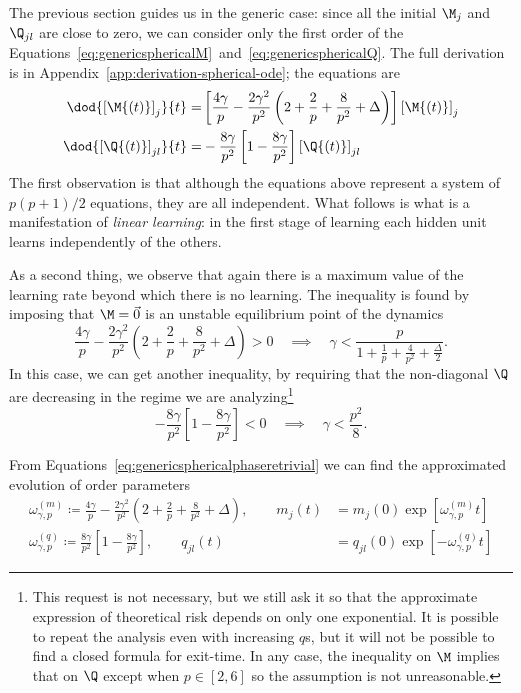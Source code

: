 The previous section guides us in the generic case: since all the initial \(\M_j\) and \(\Q_{jl}\) are close to zero,
we can consider only the first order of the Equations~\eqref{eq:genericsphericalM}~and~\eqref{eq:genericsphericalQ}.
The full derivation is in Appendix~\ref{app:derivation-spherical-ode}; the equations are
\begin{subequations}\label{eq:genericsphericalphaseretrivial}\begin{align}
  \dod{\left[\M{\left(t\right)}\right]_{j}}{t} =&
    \left[
      \frac{4 \gamma}{p} -\frac{2 \gamma^2}{p^2} \left(2 +\frac{2}{p} + \frac{8}{p^2} + \Delta \right)
    \right] \left[\M{\left(t\right)}\right]_{j} \\
  \dod{\left[\Q{\left(t\right)}\right]_{jl}}{t} =&
   -\frac{8 \gamma}{p^2} \left[1-\frac{8\gamma}{p^2}\right] \left[\Q{\left(t\right)}\right]_{jl}
\end{align}\end{subequations}
The first observation is that although the equations above represent a system of \(p(p+1)/2\) equations,
they are all independent. What follows is what is a manifestation of \emph{linear learning}: 
in the first stage of learning each hidden unit learns independently of the others.

As a second thing, we observe that again there is a maximum value of the learning rate beyond which there is no learning.
The inequality is found by imposing that \(\M=\vec{0}\) is an unstable equilibrium point of the dynamics
\[
  \frac{4 \gamma}{p} -\frac{2 \gamma^2}{p^2} \left(2 +\frac{2}{p} + \frac{8}{p^2} + \Delta \right) > 0 \quad \implies\quad
  \gamma < \frac{p}{1 +\frac{1}{p} + \frac{4}{p^2} + \frac\Delta2}.
\]
In this case, we can get another inequality, by requiring that the non-diagonal \(\Q\) are decreasing in the regime we are analyzing\footnote{
  This request is not necessary, but we still ask it so that the approximate expression of theoretical risk depends on only one exponential.
  It is possible to repeat the analysis even with increasing \(q\)s, but it will not be possible to find a closed formula for exit-time.
  In any case, the inequality on \(\M\) implies that on \(\Q\) except when \(p\in[2,6]\) so the assumption is not unreasonable.
}
\[
  -\frac{8 \gamma}{p^2} \left[1-\frac{8\gamma}{p^2}\right] < 0 \quad \implies\quad
  \gamma < \frac{p^2}{8}.
\]

From Equations~\eqref{eq:genericsphericalphaseretrivial} we can find the approximated evolution of order parameters
\[\begin{split}
  \omega^{(m)}_{\gamma,p} \coloneqq \frac{4 \gamma}{p} -\frac{2 \gamma^2}{p^2} \left(2 +\frac{2}{p} + \frac{8}{p^2} + \Delta \right), \qquad
  m_j{(t)} &= m_j{(0)} \exp\left[\omega^{(m)}_{\gamma,p}t\right] \\
  \omega^{(q)}_{\gamma,p} \coloneqq \frac{8 \gamma}{p^2} \left[1-\frac{8\gamma}{p^2}\right], \qquad
  q_{jl}{(t)} &= q_{jl}{(0)} \exp\left[-\omega^{(q)}_{\gamma,p}t\right]
\end{split}\]

